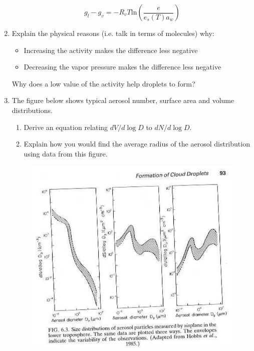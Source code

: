 \documentclass[12pt]{article}
\begin{document}
\begin{enumerate}
\begin{equation}
  \label{diff}
  g_l - g_v = -R_v T \mathrm{ln} \left ( \frac{e}{e_s(T) a_w} \right )
\end{equation}


\item Explain the physical reasons (i.e. talk in terms of molecules) why:

\begin{itemize}
\item Increasing the activity makes the difference less negative
\item Decreasing the vapor pressure makes the difference less negative
\end{itemize}

Why does a low value of the activity help droplets to form?


\item The figure below shows typical aerosol 
    number, surface area and volume distributions.
    \begin{enumerate}
    \item Derive an equation relating $d V/d\log D$ to $d  N/d\log D$.
    \item Explain how you would find the average radius of the
      aerosol  distribution using data from this figure.
    \end{enumerate}    

    \begin{figure}[H]
      \begin{center}
        \leavevmode
  \includegraphics[width=6in]{aero}
        \label{fig:aer}
    \caption{$ $}
      \end{center}
    \end{figure}



\end{enumerate}
\end{document}

